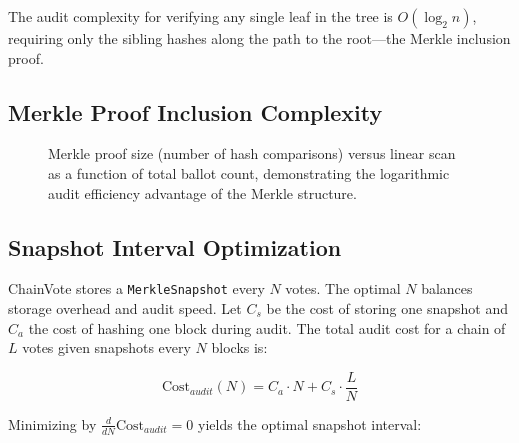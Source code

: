 \documentclass[journal,10pt,twocolumn]{IEEEtran}
\begin{document}
The audit complexity for verifying any single leaf in the tree is $O(\log_2 n)$, requiring only the sibling hashes along the path to the root—the Merkle inclusion proof.

\subsection{Merkle Proof Inclusion Complexity}

\begin{figure}[htbp]
\centering
{}
\caption{Merkle proof size (number of hash comparisons) versus linear scan as a function of total ballot count, demonstrating the logarithmic audit efficiency advantage of the Merkle structure.}
\label{fig:merkle_complexity}
\end{figure}

\subsection{Snapshot Interval Optimization}

ChainVote stores a \texttt{MerkleSnapshot} every $N$ votes. The optimal $N$ balances storage overhead and audit speed. Let $C_s$ be the cost of storing one snapshot and $C_a$ the cost of hashing one block during audit. The total audit cost for a chain of $L$ votes given snapshots every $N$ blocks is:

\begin{equation}
    \mathrm{Cost}_{audit}(N) = C_a \cdot N + C_s \cdot \frac{L}{N}
\end{equation}

Minimizing by $\frac{d}{dN}\mathrm{Cost}_{audit} = 0$ yields the optimal snapshot interval:
\end{document}
